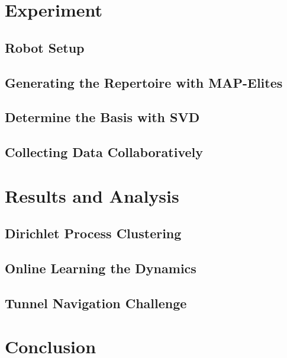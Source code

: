 \documentclass[journal]{IEEEtran}
\begin{document}
\section{Experiment}


\subsection{Robot Setup}


\subsection{Generating the Repertoire with MAP-Elites}

\subsection{Determine the Basis with SVD}

\subsection{Collecting Data Collaboratively}





\section{Results and Analysis}

\subsection{Dirichlet Process Clustering}


\subsection{Online Learning the Dynamics}

\subsection{Tunnel Navigation Challenge}


\section{Conclusion}








\end{document}
